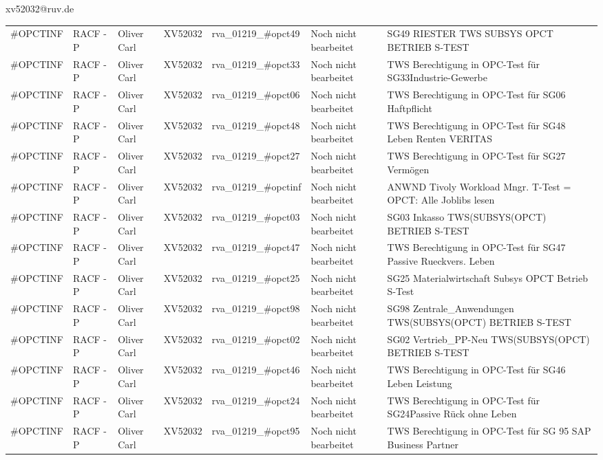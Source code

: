 \documentclass[a4paper,landscape,12pt]{letter}
\begin{document}
\begin{letter}{xv52032@ruv.de\hfill \break}
\begin{tiny}
\begin{longtable}{|p{35mm}|p{15mm}|p{25mm}|p{10mm}|p{40mm}|p{50mm}|p{50mm}|}
\#OPCTINF & RACF - P & Oliver Carl & XV52032 & rva\_01219\_\#opct49 & Noch nicht bearbeitet & SG49 RIESTER TWS SUBSYS OPCT BETRIEB S-TEST \\
\#OPCTINF & RACF - P & Oliver Carl & XV52032 & rva\_01219\_\#opct33 & Noch nicht bearbeitet & TWS Berechtigung in OPC-Test für SG33Industrie-Gewerbe \\
\#OPCTINF & RACF - P & Oliver Carl & XV52032 & rva\_01219\_\#opct06 & Noch nicht bearbeitet & TWS Berechtigung in OPC-Test für SG06 Haftpflicht \\
\#OPCTINF & RACF - P & Oliver Carl & XV52032 & rva\_01219\_\#opct48 & Noch nicht bearbeitet & TWS Berechtigung in OPC-Test für SG48 Leben Renten VERITAS \\
\#OPCTINF & RACF - P & Oliver Carl & XV52032 & rva\_01219\_\#opct27 & Noch nicht bearbeitet & TWS Berechtigung in OPC-Test für SG27 Vermögen \\
\#OPCTINF & RACF - P & Oliver Carl & XV52032 & rva\_01219\_\#opctinf & Noch nicht bearbeitet & ANWND Tivoly Workload Mngr. T-Test = OPCT: Alle Joblibs lesen \\
\#OPCTINF & RACF - P & Oliver Carl & XV52032 & rva\_01219\_\#opct03 & Noch nicht bearbeitet & SG03 Inkasso TWS(SUBSYS(OPCT) BETRIEB S-TEST \\
\#OPCTINF & RACF - P & Oliver Carl & XV52032 & rva\_01219\_\#opct47 & Noch nicht bearbeitet & TWS Berechtigung in OPC-Test für SG47 Passive Rueckvers. Leben \\
\#OPCTINF & RACF - P & Oliver Carl & XV52032 & rva\_01219\_\#opct25 & Noch nicht bearbeitet & SG25 Materialwirtschaft Subsys OPCT Betrieb S-Test \\
\#OPCTINF & RACF - P & Oliver Carl & XV52032 & rva\_01219\_\#opct98 & Noch nicht bearbeitet & SG98 Zentrale\_Anwendungen TWS(SUBSYS(OPCT) BETRIEB S-TEST \\
\#OPCTINF & RACF - P & Oliver Carl & XV52032 & rva\_01219\_\#opct02 & Noch nicht bearbeitet & SG02 Vertrieb\_PP-Neu TWS(SUBSYS(OPCT) BETRIEB S-TEST \\
\#OPCTINF & RACF - P & Oliver Carl & XV52032 & rva\_01219\_\#opct46 & Noch nicht bearbeitet & TWS Berechtigung in OPC-Test für SG46 Leben Leistung \\
\#OPCTINF & RACF - P & Oliver Carl & XV52032 & rva\_01219\_\#opct24 & Noch nicht bearbeitet & TWS Berechtigung in OPC-Test für SG24Passive Rück ohne Leben \\
\#OPCTINF & RACF - P & Oliver Carl & XV52032 & rva\_01219\_\#opct95 & Noch nicht bearbeitet &  TWS Berechtigung in OPC-Test für SG 95 SAP Business Partner \\

\end{longtable}
\end{tiny}
\end{letter}
\end{document}
